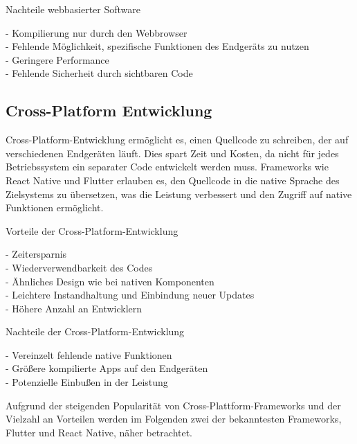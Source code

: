 \vspace{0.5cm}

Nachteile webbasierter Software

- Kompilierung nur durch den Webbrowser \\
- Fehlende Möglichkeit, spezifische Funktionen des Endgeräts zu nutzen \\
- Geringere Performance \\
- Fehlende Sicherheit durch sichtbaren Code

\vspace{0.5cm}

\subsection{Cross-Platform Entwicklung}

Cross-Platform-Entwicklung ermöglicht es, einen Quellcode zu schreiben, der auf verschiedenen Endgeräten läuft. Dies spart Zeit und Kosten, da nicht für jedes Betriebssystem ein separater Code entwickelt werden muss. Frameworks wie React Native und Flutter erlauben es, den Quellcode in die native Sprache des Zielsystems zu übersetzen, was die Leistung verbessert und den Zugriff auf native Funktionen ermöglicht.

\vspace{0.5cm}

Vorteile der Cross-Platform-Entwicklung

- Zeitersparnis \\
- Wiederverwendbarkeit des Codes \\
- Ähnliches Design wie bei nativen Komponenten \\
- Leichtere Instandhaltung und Einbindung neuer Updates \\
- Höhere Anzahl an Entwicklern

\vspace{0.5cm}

Nachteile der Cross-Platform-Entwicklung

- Vereinzelt fehlende native Funktionen \\
- Größere kompilierte Apps auf den Endgeräten \\
- Potenzielle Einbußen in der Leistung

\vspace{0.5cm}

Aufgrund der steigenden Popularität von Cross-Plattform-Frameworks und der Vielzahl an Vorteilen werden im Folgenden zwei der bekanntesten Frameworks, Flutter und React Native, näher betrachtet.

